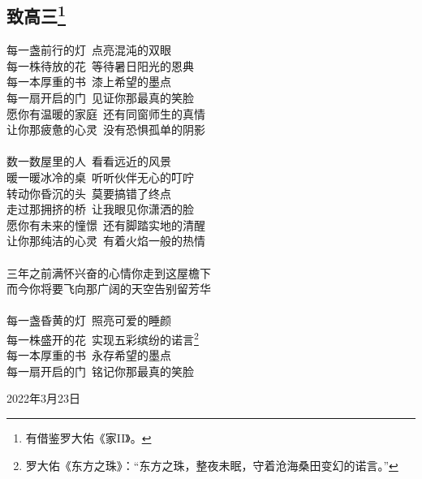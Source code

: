 \documentclass[a5paper]{ctexart}
\begin{document}
	\subsection[致高三]{致高三\footnote{有借鉴罗大佑《家II》。}}
	\begin{center}
		每一盏前行的灯\ 点亮混沌的双眼\\
		每一株待放的花\ 等待暑日阳光的恩典\\
		每一本厚重的书\ 漆上希望的墨点\\
		每一扇开启的门\ 见证你那最真的笑脸\\
		愿你有温暖的家庭\ 还有同窗师生的真情\\
		让你那疲惫的心灵\ 没有恐惧孤单的阴影\\ \hspace*{\fill} \\
		
		数一数屋里的人\ 看看远近的风景\\
		暖一暖冰冷的桌\ 听听伙伴无心的叮咛\\
		转动你昏沉的头\ 莫要搞错了终点\\
		走过那拥挤的桥\ 让我眼见你潇洒的脸\\
		愿你有未来的憧憬\ 还有脚踏实地的清醒\\
		让你那纯洁的心灵\ 有着火焰一般的热情\\ \hspace*{\fill} \\
		
		三年之前满怀兴奋的心情你走到这屋檐下\\
		而今你将要飞向那广阔的天空告别留芳华\\ \hspace*{\fill} \\
		
		每一盏昏黄的灯\ 照亮可爱的睡颜\\
		每一株盛开的花\ 实现五彩缤纷的诺言\footnote{罗大佑《东方之珠》：“东方之珠，整夜未眠，守着沧海桑田变幻的诺言。”}\\
		每一本厚重的书\ 永存希望的墨点\\
		每一扇开启的门\ 铭记你那最真的笑脸
		
	\end{center}
	\begin{flushright}
		2022年3月23日
	\end{flushright}
	
\end{document}
